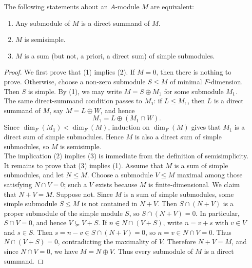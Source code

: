 \documentclass[../Odyssey_Project.tex]{subfiles}
\begin{document}
\begin{lemma}
\label{lem:13.1}
The following statements about an $A$-module $M$ are equivalent:
\begin{enumerate}
    \item Any submodule of $M$ is a direct summand of $M$.
    \item $M$ is semisimple.
    \item $M$ is a sum (but not, a priori, a direct sum) of simple submodules.
\end{enumerate}
\end{lemma}
\begin{proof}
    We first prove that (1) implies (2). If $M = 0$, then there is nothing to prove. Otherwise, choose a non-zero submodule $S \leq M$ of minimal $F$-dimension. Then $S$ is simple. By (1), we may write $M = S \oplus M_1$ for some submodule $M_1$. The same direct-summand condition passes to $M_1$: if $L \leq M_1$, then $L$ is a direct summand of $M$, say $M = L \oplus W$, and hence
    \[
        M_1 = L \oplus (M_1 \cap W).
    \]
    Since $\dim_F(M_1) < \dim_F(M)$, induction on $\dim_F(M)$ gives that $M_1$ is a direct sum of simple submodules. Hence $M$ is also a direct sum of simple submodules, so $M$ is semisimple.\\
    The implication (2) implies (3) is immediate from the definition of semisimplicity. It remains to prove that (3) implies (1). Assume that $M$ is a sum of simple submodules, and let $N \leq M$. Choose a submodule $V \leq M$ maximal among those satisfying $N \cap V = 0$; such a $V$ exists because $M$ is finite-dimensional. We claim that $N + V = M$. Suppose not. Since $M$ is a sum of simple submodules, some simple submodule $S \leq M$ is not contained in $N + V$. Then $S \cap (N + V)$ is a proper submodule of the simple module $S$, so $S \cap (N + V) = 0$. In particular, $S \cap V = 0$, and hence $V \subsetneq V + S$. If $n \in N \cap (V + S)$, write $n = v + s$ with $v \in V$ and $s \in S$. Then $s = n - v \in S \cap (N + V) = 0$, so $n = v \in N \cap V = 0$. Thus $N \cap (V + S) = 0$, contradicting the maximality of $V$. Therefore $N + V = M$, and since $N \cap V = 0$, we have $M = N \oplus V$. Thus every submodule of $M$ is a direct summand.
\end{proof}
\end{document}

